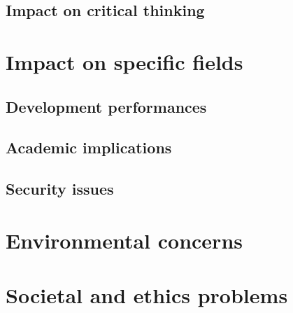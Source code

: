 \documentclass[11pt]{article}
\begin{document}
\subsection{Impact on critical thinking}\label{sec:critical}
\section{Impact on specific fields}\label{sec:specific}
\subsection{Development performances}\label{subsec:developement}
\subsection{Academic implications}\label{subsec:academic}
\subsection{Security issues}\label{subnsec:security}
\section{Environmental concerns}\label{sec:environement}
\section{Societal and ethics problems}\label{sec:social}

\newpage
\ifdefined\HCode
\else
{}
\fi
\nocite{*}
\printbibliography
\end{document}

